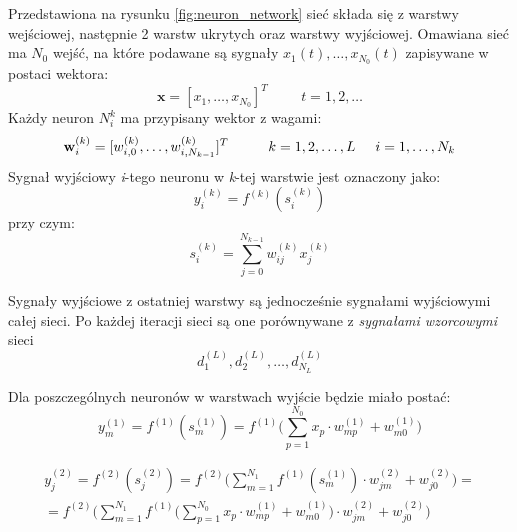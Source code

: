 \documentclass[a4paper,12pt]{article}
\numberwithin{equation}{section}
\begin{document}
Przedstawiona na rysunku \ref{fig:neuron_network} sieć składa się z warstwy wejściowej, następnie 2 warstw ukrytych oraz warstwy wyjściowej. Omawiana sieć ma $N_0$ wejść, na które podawane są sygnały $x_1(t),\dots,x_{N_0}(t)$ zapisywane w postaci wektora:
\begin{equation}
    \textbf{x}=[x_1,\dots,x_{N_0}]^T
    \hspace{1cm}
    t=1,2,\dots
\end{equation}
Każdy neuron $N_i^k$ ma przypisany wektor z wagami:
\begin{equation}
    \textbf{w}_i^{(k)}=[w_{i,0}^{(k)}, \dots, w_{i,N_{k-1}}^{(k)}]^T \hspace{1cm}
    k=1,2,\dots,L \hspace{0.5cm}
    i=1,\dots,N_k
\end{equation}
Sygnał wyjściowy \textit{i}-tego neuronu w \textit{k}-tej warstwie jest oznaczony jako:
\begin{equation}
    y_i^{(k)}=f^{(k)}(s_i^{(k)})
\end{equation}
przy czym:
\begin{equation}
    s_i^{(k)}=\sum_{j=0}^{N_{k-1}}w_{ij}^{(k)}x_j^{(k)}
\end{equation}

Sygnały wyjściowe z ostatniej warstwy są jednocześnie sygnałami wyjściowymi całej sieci. Po każdej iteracji sieci są one porównywane z \textit{sygnałami wzorcowymi} sieci \cite{book_rutkowski}
\begin{equation}
    d_1^{(L)},d_2^{(L)},\dots,d_{N_L}^{(L)}
\end{equation}

Dla poszczególnych neuronów w warstwach wyjście będzie miało postać:
\begin{equation}
    y_m^{(1)} = f^{(1)}(s_m^{(1)}) = f^{(1)} \Big( \sum_{p=1}^{N_0} x_p \cdot w_{mp}^{(1)} + w_{m0}^{(1)} \Big)
\end{equation}

\begin{equation}
\begin{aligned}
    y_j^{(2)} = f^{(2)}(s_j^{(2)}) = f^{(2)} \Big( \sum_{m=1}^{N_1} f^{(1)}(s_m^{(1)}) \cdot w_{jm}^{(2)} + w_{j0}^{(2)} \Big) = \\
    = f^{(2)} \Big( \sum_{m=1}^{N_1} f^{(1)} \Big(\sum_{p=1}^{N_0} x_p \cdot w_{mp}^{(1)} + w_{m0}^{(1)} \Big) \cdot w_{jm}^{(2)} + w_{j0}^{(2)} \Big)
\end{aligned}
\end{equation}
\end{document}

